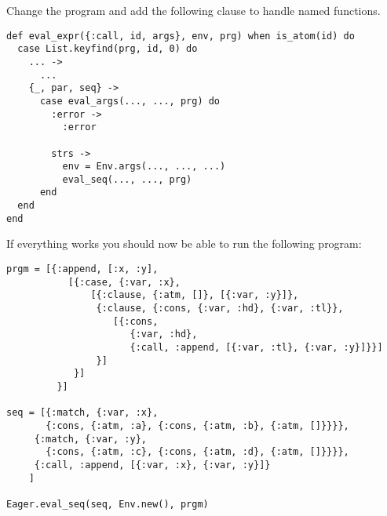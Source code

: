 \documentclass[a4paper,11pt]{article}
\begin{document}
Change the program and add the following clause to handle named
functions.

\pagebreak

\begin{verbatim}
def eval_expr({:call, id, args}, env, prg) when is_atom(id) do
  case List.keyfind(prg, id, 0) do
    ... ->
      ...
    {_, par, seq} ->
      case eval_args(..., ..., prg) do
        :error ->
          :error

        strs ->
          env = Env.args(..., ..., ...)
          eval_seq(..., ..., prg)
      end
  end
end
\end{verbatim}

If everything works you should now be able to run the following program:

\begin{verbatim}
prgm = [{:append, [:x, :y],
           [{:case, {:var, :x}, 
               [{:clause, {:atm, []}, [{:var, :y}]},
                {:clause, {:cons, {:var, :hd}, {:var, :tl}}, 
                   [{:cons, 
                      {:var, :hd}, 
                      {:call, :append, [{:var, :tl}, {:var, :y}]}}]
                }]
            }]
         }]
         
seq = [{:match, {:var, :x}, 
       {:cons, {:atm, :a}, {:cons, {:atm, :b}, {:atm, []}}}},
     {:match, {:var, :y}, 
       {:cons, {:atm, :c}, {:cons, {:atm, :d}, {:atm, []}}}},
     {:call, :append, [{:var, :x}, {:var, :y}]}
    ]
    
Eager.eval_seq(seq, Env.new(), prgm)
\end{verbatim}
\end{document}
